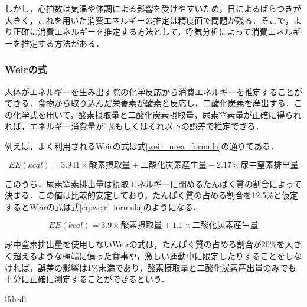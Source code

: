 しかし，心拍数は気温や体調による影響を受けやすいため，日によるばらつきが大きく，これを用いた消費エネルギーの推定は精度面で問題が残る．そこで，より正確に消費エネルギーを推定する方法として，呼気分析によって消費エネルギーを推定する方法がある．

\subsubsection{Weirの式}

人体がエネルギーを生み出す際の化学反応から消費エネルギーを推定することができる．食物から取り込んだ栄養素が酸素と反応し，二酸化炭素を産出する．この化学式を用いて，酸素摂取量と二酸化炭素摂取量，尿素窒素量が正確に得られれば，エネルギー消費量が1\%もしくはそれ以下の誤差で推定できる\cite{livesey_1988}．

例えば，よく利用されるWeir\cite{weir_1949}の式は式\ref{weir_urea_formula}の通りである．

\begin{equation}
  \label{weir_urea_formula}
  EE(kcal) = 3.941 \times 酸素摂取量 + 二酸化炭素産生量 - 2.17 \times 尿中窒素排出量
\end{equation}

このうち，尿素窒素排出量は摂取エネルギーに閉めるたんぱく質の割合によって決まる．この値は比較的安定しており，たんぱく質の占める割合を12.5\%と仮定するとWeirの式は式\ref{eq:weir_formula}のようになる．

\begin{equation}
  \label{eq:weir_formula}
  EE(kcal) = 3.9 \times 酸素摂取量 + 1.1 \times 二酸化炭素産生量
\end{equation}

尿中窒素排出量を使用しないWeirの式は，たんぱく質の占める割合が20\%を大きく超えるような極端に偏った食事や，激しい運動中に限定したりすることをしなければ，誤差の影響は1\%未満であり，酸素摂取量と二酸化炭素産出量のみでも十分に正確に測定することができるという\cite{tanaka_2006}．

\expandafter\ifx\csname ifdraft\endcsname\relax
  
\fi
